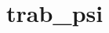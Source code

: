 \chapter{trab\+\_\+psi}
\hypertarget{md__r_e_a_d_m_e}{}\label{md__r_e_a_d_m_e}
\label{md__r_e_a_d_m_e_autotoc_md0}%
%
